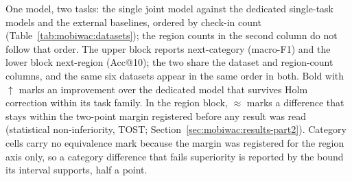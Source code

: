 \begin{table}[htbp]
\caption{One model, two tasks: the single joint model against the dedicated single-task models and the
external baselines, ordered by check-in count (Table~\ref{tab:mobiwac:datasets}); the region counts in
the second column do not follow that order. The upper block reports next-category (macro-F1) and the
lower block next-region (Acc@10); the two share the dataset and region-count columns, and the same
six datasets appear in the same order in both. Bold with $\uparrow$ marks an improvement over the
dedicated model that survives Holm correction within its task family. In the region block, $\approx$
marks a difference that stays within the two-point margin registered before any result was read
(statistical non-inferiority, TOST; Section~\ref{sec:mobiwac:results-part2}). Category cells carry no
equivalence mark because the margin was registered for the region axis only, so a category difference
that fails superiority is reported by the bound its interval supports, half a point.}
\label{tab:mobiwac:results}
\centering

\end{table}
